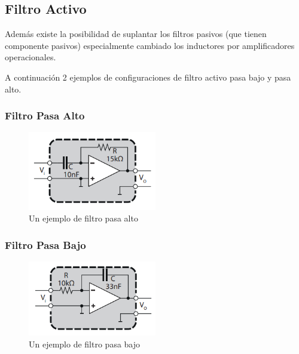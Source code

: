 \documentclass[../main.tex]{subfiles}
\begin{document}
	\subsection{Filtro Activo}
	Además existe la posibilidad de suplantar los filtros pasivos (que tienen componente
	pasivos) especialmente cambiado los inductores por amplificadores operacionales.

	A continuación 2 ejemplos de configuraciones de filtro activo pasa bajo y pasa alto.
		\subsubsection{Filtro Pasa Alto}
		\begin{figure}[H]
			\centering
			\includegraphics[width=0.5\textwidth]{imagen7.png}
			\caption{Un ejemplo de filtro pasa alto}
		\end{figure}

		\subsubsection{Filtro Pasa Bajo}
		\begin{figure}[H]
			\centering
			\includegraphics[width=0.5\textwidth]{imagen8.png}
			\caption{Un ejemplo de filtro pasa bajo}
		\end{figure}
	\clearpage	
\end{document}
